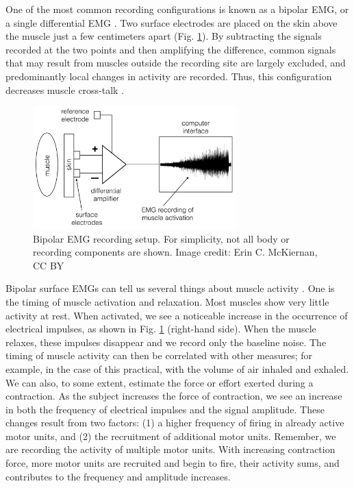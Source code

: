 \documentclass[12pt]{article}
\begin{document}
One of the most common recording configurations is known as a bipolar EMG, or a single differential EMG \cite{garcia2011surface}. Two surface electrodes are placed on the skin above the muscle just a few centimeters apart (Fig. \ref{fig:emg}). By subtracting the signals recorded at the two points and then amplifying the difference, common signals that may result from muscles outside the recording site are largely excluded, and predominantly local changes in activity are recorded. Thus, this configuration decreases muscle cross-talk \cite{garcia2011surface}. 

\begin{figure}[h!]
\centering
\includegraphics[width=0.7\textwidth]{images/emgAmp.png}
\caption{Bipolar EMG recording setup. For simplicity, not all body or recording components are shown. Image credit: Erin C. McKiernan, CC BY}
\label{fig:emg}
\end{figure}

Bipolar surface EMGs can tell us several things about muscle activity \cite{garcia2011surface}. One is the timing of muscle activation and relaxation. Most muscles show very little activity at rest. When activated, we see a noticeable increase in the occurrence of electrical impulses, as shown in Fig. \ref{fig:emg} (right-hand side). When the muscle relaxes, these impulses disappear and we record only the baseline noise. The timing of muscle activity can then be correlated with other measures; for example, in the case of this practical, with the volume of air inhaled and exhaled. We can also, to some extent, estimate the force or effort exerted during a contraction. As the subject increases the force of contraction, we see an increase in both the frequency of electrical impulses and the signal amplitude. These changes result from two factors: (1) a higher frequency of firing in already active motor units, and (2) the recruitment of additional motor units. Remember, we are recording the activity of multiple motor units. With increasing contraction force, more motor units are recruited and begin to fire, their activity sums, and contributes to the frequency and amplitude increases.
\end{document}
